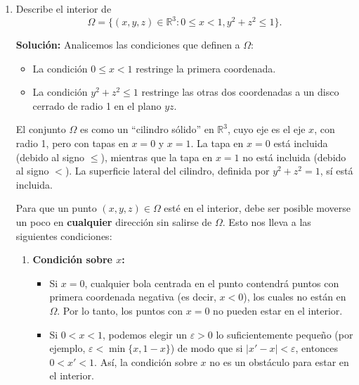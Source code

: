\documentclass[12pt]{article}
\newcommand{\abs}[1]{\left\vert#1\right\vert}
\newcommand{\norm}[1]{\left\Vert#1\right\Vert}
\newcommand{\R}{\mathbb R}
\newcommand{\x}{\mathrm x}
\begin{document}
\begin{enumerate}
\begin{enumerate}[(1)]
\textbf{Segunda desigualdad:} $\norm{\x}\leq \norm{\x}_1$.

Demostraremos esta desigualdad elevando al cuadrado ambos lados. Como ambas cantidades son no negativas, es suficiente demostrar que $\norm{\x}^2 \leq \norm{\x}_1^2$. Tenemos:
\[
\norm{\x}^2 = \sum_{i=1}^{n} x_i^2.
\]
Por otro lado,
\[
\norm{\x}_1^2 = \left(\sum_{i=1}^{n} \abs{x_i}\right)^2 = \sum_{i=1}^{n} \abs{x_i}^2 + 2\sum_{1 \leq i < j \leq n} \abs{x_i}\abs{x_j}.
\]
Observamos que $\sum_{i=1}^{n} \abs{x_i}^2 = \sum_{i=1}^{n} x_i^2 = \norm{\x}^2$ y que el término $2\sum_{1 \leq i < j \leq n} \abs{x_i}\abs{x_j}$ es no negativo (es una suma de productos de valores absolutos, todos $\geq 0$). Por lo tanto,
\[
\norm{\x}_1^2 = \norm{\x}^2 + 2\sum_{1 \leq i < j \leq n} \abs{x_i}\abs{x_j} \geq \norm{\x}^2.
\]
Tomando raíz cuadrada en ambos lados, concluimos que
\[
\norm{\x} \leq \norm{\x}_1.
\]
Por lo tanto, combinando ambas desigualdades, se cumple
\[
\frac{1}{\sqrt{n}}\norm{\x}_1\leq \norm{\x}\leq \norm{\x}_1.
\]
\end{enumerate}

\item Describe el interior de
\[ \Omega = \{ (x,y,z)\in \R^3 : 0\leq x < 1, y^2+z^2\leq 1\}. \]

\textbf{Solución: }
Analicemos las condiciones que definen a $\Omega$:
\begin{itemize}
    \item La condición $0 \leq x < 1$ restringe la primera coordenada.
    \item La condición $y^2 + z^2 \leq 1$ restringe las otras dos coordenadas a un disco cerrado de radio 1 en el plano $yz$.
\end{itemize}

El conjunto $\Omega$ es como un ``cilindro sólido'' en $\R^3$, cuyo eje es el eje $x$, con radio 1, pero con tapas en $x=0$ y $x=1$. La tapa en $x=0$ está incluida (debido al signo $\leq$), mientras que la tapa en $x=1$ no está incluida (debido al signo $<$). La superficie lateral del cilindro, definida por $y^2+z^2 = 1$, sí está incluida.

Para que un punto $(x,y,z) \in \Omega$ esté en el interior, debe ser posible moverse un poco en \textbf{cualquier} dirección sin salirse de $\Omega$. Esto nos lleva a las siguientes condiciones:

\begin{enumerate}
    \item \textbf{Condición sobre $x$:} 
    \begin{itemize}
        \item Si $x = 0$, cualquier bola centrada en el punto contendrá puntos con primera coordenada negativa (es decir, $x < 0$), los cuales no están en $\Omega$. Por lo tanto, los puntos con $x=0$ no pueden estar en el interior.
        \item Si $0 < x < 1$, podemos elegir un $\varepsilon > 0$ lo suficientemente pequeño (por ejemplo, $\varepsilon < \min\{x, 1-x\}$) de modo que si $|x' - x| < \varepsilon$, entonces $0 < x' < 1$. Así, la condición sobre $x$ no es un obstáculo para estar en el interior.
    \end{itemize}
    

\end{enumerate}
\end{enumerate}
\end{document}
